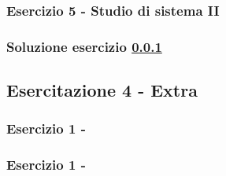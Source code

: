 \documentclass[../main.tex]{subfiles}
\begin{document}
\vspace*{1.5cm}
\subsubsection{Esercizio 5 - Studio di sistema II}
\label{ss45}

\subsubsection*{Soluzione esercizio \ref{ss45}}

\subsection{Esercitazione 4 - Extra}

\subsubsection{Esercizio 1 - }

\subsubsection{Esercizio 1 - }
\end{document}
